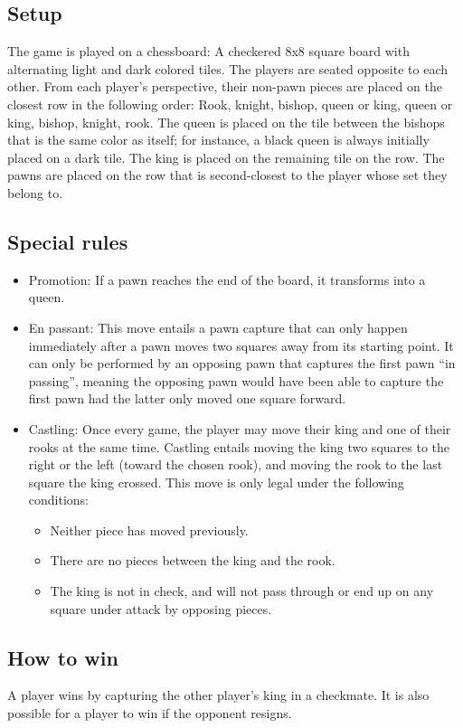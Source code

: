 \documentclass[12pt, a4paper]{article}
\begin{document}
\subsection{Setup}
The game is played on a chessboard: A checkered 8x8 square board with alternating light and dark colored tiles. The players are seated opposite to each other. From each player’s perspective, their non-pawn pieces are placed on the closest row in the following order: Rook, knight, bishop, queen or king, queen or king, bishop, knight, rook. The queen is placed on the tile between the bishops that is the same color as itself; for instance, a black queen is always initially placed on a dark tile. The king is placed on the remaining tile on the row. The pawns are placed on the row that is second-closest to the player whose set they belong to.

\subsection{Special rules}
\begin{itemize}
\item Promotion: If a pawn reaches the end of the board, it transforms into a queen.
\item En passant: This move entails a pawn capture that can only happen immediately after a pawn moves two squares away from its starting point. It can only be performed by an opposing pawn that captures the first pawn “in passing”, meaning the opposing pawn would have been able to capture the first pawn had the latter only moved one square forward.
\item Castling: Once every game, the player may move their king and one of their rooks at the same time. Castling entails moving the king two squares to the right or the left (toward the chosen rook), and moving the rook to the last square the king crossed. This move is only legal under the following conditions:	
\begin{itemize}
\item Neither piece has moved previously.
\item There are no pieces between the king and the rook.
\item The king is not in check, and will not pass through or end up on any square under attack by opposing pieces.
\end{itemize}
\end{itemize}

\subsection{How to win}
A player wins by capturing the other player’s king in a checkmate. It is also possible for a player to win if the opponent resigns.
\end{document}
